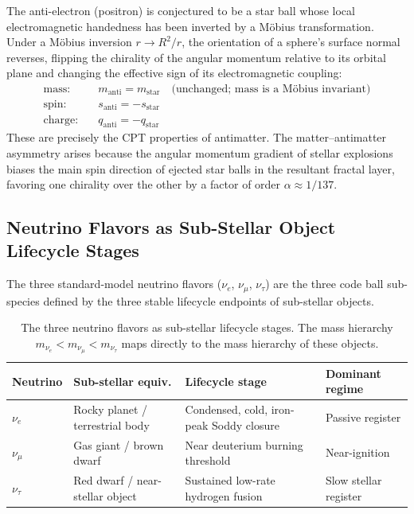 \documentclass[11pt,a4paper]{article}
\begin{document}
The anti-electron (positron) is conjectured to be a star ball whose local
electromagnetic handedness has been inverted by a M\"obius transformation. Under a
M\"obius inversion $r \to R^2/r$, the orientation of a sphere's surface normal
reverses, flipping the chirality of the angular momentum relative to its orbital
plane and changing the effective sign of its electromagnetic coupling:
\begin{align*}
  \text{mass:}   &\quad m_{\text{anti}} = m_{\text{star}} \quad
                         \text{(unchanged; mass is a M\"obius invariant)} \\
  \text{spin:}   &\quad s_{\text{anti}} = -s_{\text{star}} \\
  \text{charge:} &\quad q_{\text{anti}} = -q_{\text{star}}
\end{align*}
These are precisely the CPT properties of antimatter. The matter--antimatter
asymmetry arises because the angular momentum gradient of stellar explosions biases
the main spin direction of ejected star balls in the resultant fractal layer,
favoring one chirality over the other by a factor of order $\alpha \approx 1/137$.

\subsection{Neutrino Flavors as Sub-Stellar Object Lifecycle Stages}

The three standard-model neutrino flavors ($\nu_e$, $\nu_\mu$, $\nu_\tau$) are the
three code ball sub-species defined by the three stable lifecycle endpoints of
sub-stellar objects.

\begin{table}[h]
\centering
\begin{tabular}{|l|p{3cm}|p{3cm}|p{2.8cm}|}
\hline
\textbf{Neutrino} & \textbf{Sub-stellar equiv.} & \textbf{Lifecycle stage}
  & \textbf{Dominant regime} \\
\hline
$\nu_e$ & Rocky planet / terrestrial body
  & Condensed, cold, iron-peak Soddy closure
  & Passive register \\
\hline
$\nu_\mu$ & Gas giant / brown dwarf
  & Near deuterium burning threshold
  & Near-ignition \\
\hline
$\nu_\tau$ & Red dwarf / near-stellar object
  & Sustained low-rate hydrogen fusion
  & Slow stellar register \\
\hline
\end{tabular}
\caption{The three neutrino flavors as sub-stellar lifecycle stages. The mass
hierarchy $m_{\nu_e} < m_{\nu_\mu} < m_{\nu_\tau}$ maps directly to the mass
hierarchy of these objects.}
\end{table}
\end{document}
